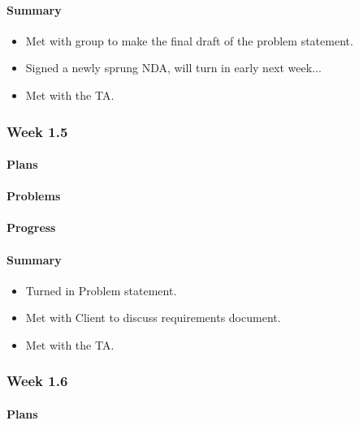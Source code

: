 \documentclass[onecolumn, draftclsnofoot,10pt, compsoc]{article}
\begin{document}
		    \paragraph{Summary}
		    	\begin{itemize}
		            \item Met with group to make the final draft of the problem statement.
                    \item Signed a newly sprung NDA, will turn in early next week...
                    \item  Met with the TA.
                \end{itemize}


		\subsubsection{Week 1.5}

		    \paragraph{Plans} \hfill \break

		    \paragraph{Problems} \hfill \break

		    \paragraph{Progress} \hfill \break

		    \paragraph{Summary} \hfill \break
		    	\begin{itemize}
		            \item Turned in Problem statement.
                    \item Met with Client to discuss requirements document.
                    \item Met with the TA.\\
                \end{itemize}


		\subsubsection{Week 1.6}

		    \paragraph{Plans} \hfill \break
\end{document}
